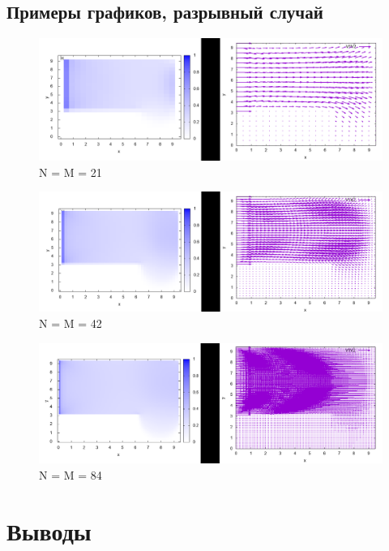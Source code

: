 \documentclass[a4paper,11pt]{article}
\begin{document}
\newpage
\subsection{Примеры графиков, разрывный случай}
\begin{figure}[H]
\centering
\includegraphics[width=1.0\textwidth]{discont_21.png}
\caption{N = M = 21}
\end{figure}
\begin{figure}[H]
\centering
\includegraphics[width=1.0\textwidth]{discont_42.png}
\caption{N = M = 42}
\end{figure}
\begin{figure}[H]
\centering
\includegraphics[width=1.0\textwidth]{discont_84.png}
\caption{N = M = 84}
\end{figure}














\section{Выводы}
\end{document}
